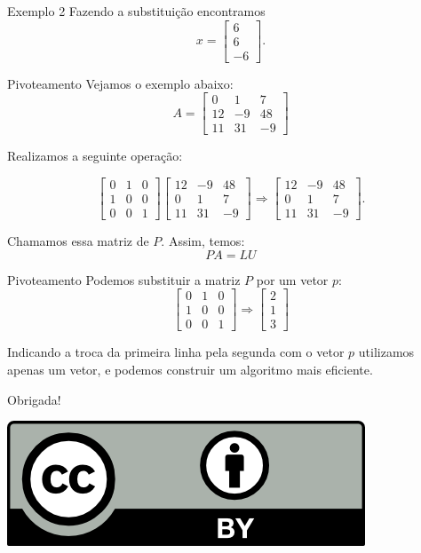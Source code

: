 \documentclass[]{beamer}
\begin{document}
\begin{frame}{Exemplo 2}
Fazendo a substituição encontramos  $$x=\begin{bmatrix}6\\ 6\\ -6\end{bmatrix}.$$
\end{frame}

\begin{frame}{Pivoteamento}
Vejamos o exemplo abaixo:
	$$A=\begin{bmatrix}0&1&7\\ 12&-9&48\\ 11&31&-9\end{bmatrix}$$
	
	 Realizamos a seguinte operação: 
	 
	 $$\begin{bmatrix}0&1&0\\ 1&0&0\\ 0&0&1\end{bmatrix} \begin{bmatrix}12&-9&48\\ 0&1&7\\ 11&31&-9\end{bmatrix} \Rightarrow \begin{bmatrix}12&-9&48\\ 0&1&7\\ 11&31&-9\end{bmatrix}.$$ 
	 
	 Chamamos essa matriz de $P$. Assim, temos:	$$PA=LU$$
	
\end{frame}

\begin{frame}{Pivoteamento}
	Podemos substituir a matriz $P$ por um vetor $p:$
	$$\begin{bmatrix}0&1&0\\ 1&0&0\\ 0&0&1\end{bmatrix} \Rightarrow \begin{bmatrix}2\\ 1\\ 3\end{bmatrix} $$
	
	Indicando a troca da primeira linha pela segunda com o vetor $p$ utilizamos apenas um vetor, e podemos construir um algoritmo mais eficiente.

\end{frame}

\begin{frame}
\vfill
\vfill
\vfill
\begin{center}
\Huge Obrigada!
\end{center}
\vfill
\vfill
\begin{center}
\href{http://creativecommons.org/licenses/by/4.0/}{\includegraphics{figures/by.png}} \end{center}

\end{frame}
\end{document}
